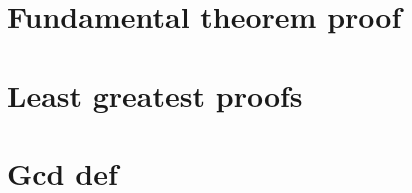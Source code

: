 
\section*{Fundamental theorem proof}

\vfill
\section*{Least greatest proofs}

\vfill
\section*{Gcd def}

\vfill
